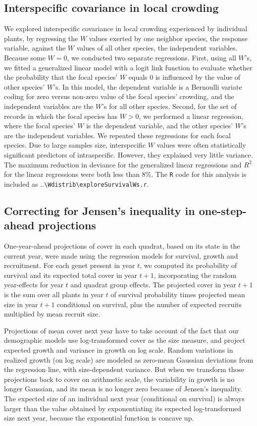 \documentclass[11pt]{article}
\begin{document}
\subsection{Interspecific covariance in local crowding} 
We explored interspecific covariance in local crowding experienced by individual plants, by regressing the $W$ values exerted by one neighbor species,
 the response variable, against the $W$ values of all other species, the independent variables. Because some $W=0$, we conducted two 
 separate regressions. First, using all $W$'s, we fitted a generalized linear model with a logit link function to evaluate whether the 
 probability that the focal species' $W$ equals 0 is influenced by the value of other species' $W$'s. In this model, the dependent 
 variable is a Bernoulli variate coding for zero versus non-zero value of the focal species' crowding, and the independent 
 variables are the $W$'s for all other species. Second, for the set of records in which the focal species has $W>0$, we 
 performed a linear regression, where the focal species' $W$ is the dependent variable, and the other species' $W$'s are 
 the independent variables. We repeated these regressions for each focal species. Due to large samples size, interspecific $W$ 
 values were often statistically significant predictors of intraspecific. However, they explained very little variance. The 
 maximum reduction in deviance for the generalized linear regressions and $R^2$ for the linear regressions were both less 
 than 8\%. The \texttt{R} code for this analysis is included as ..\texttt{\textbackslash Wdistrib\textbackslash exploreSurvivalWs.r}.
 
\subsection{Correcting for Jensen's inequality in one-step-ahead projections} 
One-year-ahead projections of cover in each quadrat, based on its state in the current year, were made using the regression models for survival, growth and recruitment. 
For each genet present in year $t$, we computed its probability of survival and its expected total cover in year $t+1$, incorporating the random 
year-effects for year $t$ and quadrat group effects. The projected cover in year $t+1$ is the sum over all plants in year $t$ of survival probability times  
projected mean size in year $t+1$ conditional on survival, plus the number of expected recruits multiplied by mean recruit size. 

Projections of mean cover next year have to take account of the fact that our demographic models use log-transformed cover as the size measure, 
and project expected growth and variance in growth on log scale. Random variations in realized growth (on log scale) are modeled as zero-mean Gaussian deviations from the 
regression line, with size-dependent variance. But when we transform those projections back to cover on arithmetic scale, the variability in growth is no longer Gaussian, and 
its mean is no longer zero because of Jensen's inequality. The expected size of an individual next year (conditional on survival) is always larger than the value 
obtained by exponentiating its expected log-transformed size next year, because the exponential function is concave up.  
\end{document}
